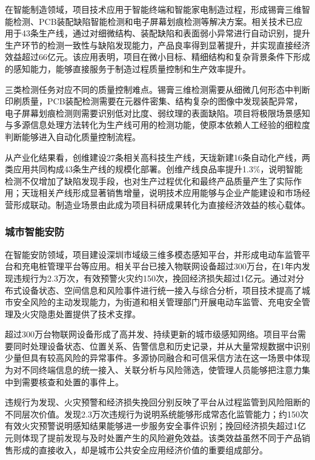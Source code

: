 在智能制造领域，项目技术应用于智能终端和智能家电制造过程，形成锡膏三维智能检测、PCB装配缺陷智能检测和电子屏幕划痕检测等解决方案。相关技术已应用于43条生产线，通过对细微结构、装配缺陷和表面弱小异常进行自动识别，提升生产环节的检测一致性与缺陷发现能力，产品良率得到显著提升，并实现直接经济效益超过66亿元。该应用表明，项目在微小目标、精细结构和复杂背景条件下形成的感知能力，能够直接服务于制造过程质量控制和生产效率提升。

三类检测任务对应不同的质量控制难点。锡膏三维检测需要从细微几何形态中判断印刷质量，PCB装配检测需要在元器件密集、结构复杂的图像中发现装配异常，电子屏幕划痕检测则需要识别低对比度、弱纹理的表面缺陷。项目将极限场景感知与多源信息处理方法转化为生产线可用的检测功能，使原本依赖人工经验的细粒度判断能够进入自动化质量控制流程。

从产业化结果看，创维建设27条相关高科技生产线，天珑新建16条自动化产线，两类应用共同构成43条生产线的规模化部署。创维产线良品率提升1.3\%，说明智能检测不仅增加了缺陷发现手段，也对生产过程优化和最终产品质量产生了实际作用；天珑相关产线形成显著销售增量，说明技术应用能够与企业产能建设和市场经营形成联动。制造业场景由此成为项目科研成果转化为直接经济效益的核心载体。

\subsubsection{城市智能安防}

在智能安防领域，项目建设深圳市域级三维多模态感知平台，并形成电动车监管平台和充电桩管理平台等应用。相关平台已接入物联网设备超过300万台，在1年内发现违规行为2.3万次，有效预警火灾约150次，挽回经济损失超过1亿元。通过对分布式设备状态、空间信息和风险事件进行统一接入与综合分析，项目技术提高了城市安全风险的主动发现能力，为街道和相关管理部门开展电动车监管、充电安全管理及火灾隐患处置提供了技术支撑。

超过300万台物联网设备形成了高并发、持续更新的城市级感知网络。项目平台需要同时处理设备状态、位置关系、告警信息和历史记录，并从大量常规数据中识别少量但具有较高风险的异常事件。多源协同融合和可信采信方法在这一场景中体现为对不同终端信息的统一接入、关联分析与风险筛选，使管理人员能够把注意力集中到需要核查和处置的事件上。

违规行为发现、火灾预警和经济损失挽回分别反映了平台从过程监管到风险阻断的不同层次价值。发现2.3万次违规行为说明系统能够形成常态化监管能力；约150次有效火灾预警说明感知结果能够进一步服务安全事件识别；挽回经济损失超过1亿元则体现了提前发现与及时处置产生的风险避免效益。该类效益虽然不同于产品销售形成的直接收入，却是城市公共安全应用经济价值的重要组成部分。

